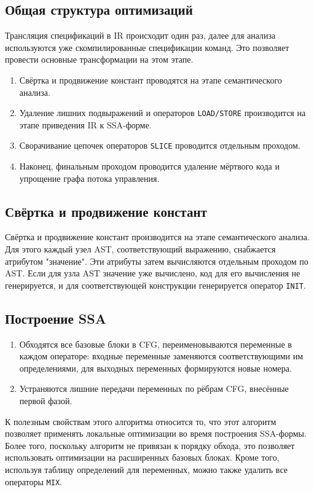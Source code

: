 \documentclass[11pt]{article}
\begin{document}
\subsection{Общая структура оптимизаций}
\label{sec:orgb245074}
Трансляция спецификаций в IR происходит один раз, далее для анализа используются уже скомпилированные спецификации команд. Это позволяет провести основные трансформации на этом этапе.
\begin{enumerate}
\item Свёртка и продвижение констант проводятся на этапе семантического анализа.
\item Удаление лишних подвыражений и операторов \texttt{LOAD/STORE} производится на этапе приведения IR к SSA-форме.
\item Сворачивание цепочек операторов \texttt{SLICE} проводится отдельным проходом.
\item Наконец, финальным проходом проводится удаление мёртвого кода и упрощение графа потока управления.
\end{enumerate}
\subsection{Свёртка и продвижение констант}
\label{sec:orga71dee2}
Свёртка и продвижение констант производится на этапе семантического анализа. Для этого каждый узел AST, соответствующий выражению, снабжается атрибутом "значение". Эти атрибуты затем вычисляются отдельным проходом по AST. Если для узла AST значение уже вычислено, код для его вычисления не генерируется, и для соответствующей конструкции генерируется оператор \texttt{INIT}.
\subsection{Построение SSA}
\label{sec:orgf8a3024}
\begin{enumerate}
\item Обходятся все базовые блоки в CFG, переименовываются переменные в каждом операторе: входные переменные заменяются соответствующими им определениями, для выходных переменных формируются новые номера.
\item Устраняются лишние передачи переменных по рёбрам CFG, внесённые первой фазой.
\end{enumerate}
К полезным свойствам этого алгоритма относится то, что этот алгоритм позволяет применять локальные оптимизации во время построения SSA-формы. Более того, поскольку алгоритм не привязан к порядку обхода, это позволяет использовать оптимизации на расширенных базовых блоках. Кроме того, используя таблицу определений для переменных, можно также удалить все операторы \texttt{MIX}.
\end{document}
